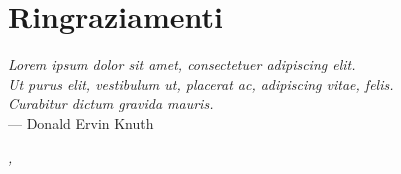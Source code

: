 
\cleardoublepage
{}
{}

\chapter*{Ringraziamenti}

\begin{flushright}{\slshape    
	Lorem ipsum dolor sit amet, consectetuer adipiscing elit. \\
	Ut purus elit, vestibulum ut, placerat ac, adipiscing vitae, felis. \\
	Curabitur dictum gravida mauris.} \\ \medskip
    --- Donald Ervin Knuth
\end{flushright}

\lipsum[1]

\bigskip
 
\noindent\textit{\myLocation, \MakeTextLowercase{\myTime}}